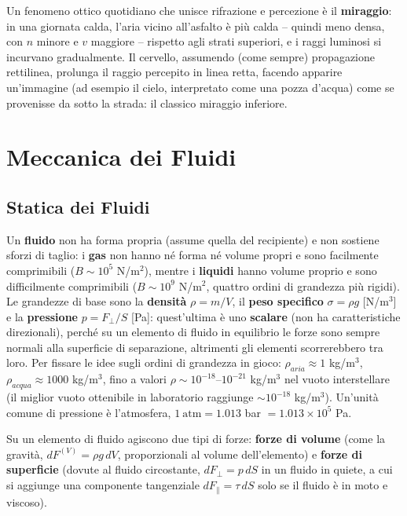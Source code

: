 \documentclass[a4paper,11pt]{article}
\begin{document}
Un fenomeno ottico quotidiano che unisce rifrazione e percezione è il \textbf{miraggio}: in una giornata calda, l'aria vicino all'asfalto è più calda -- quindi meno densa, con $n$ minore e $v$ maggiore -- rispetto agli strati superiori, e i raggi luminosi si incurvano gradualmente. Il cervello, assumendo (come sempre) propagazione rettilinea, prolunga il raggio percepito in linea retta, facendo apparire un'immagine (ad esempio il cielo, interpretato come una pozza d'acqua) come se provenisse da sotto la strada: il classico miraggio inferiore.

\newpage
\section{Meccanica dei Fluidi}

\subsection{Statica dei Fluidi}

Un \textbf{fluido} non ha forma propria (assume quella del recipiente) e non sostiene sforzi di taglio: i \textbf{gas} non hanno né forma né volume propri e sono facilmente comprimibili ($B\sim10^5$ N/m$^2$), mentre i \textbf{liquidi} hanno volume proprio e sono difficilmente comprimibili ($B\sim10^9$ N/m$^2$, quattro ordini di grandezza più rigidi). Le grandezze di base sono la \textbf{densità} $\rho=m/V$, il \textbf{peso specifico} $\sigma=\rho g$ [N/m$^3$] e la \textbf{pressione} $p=F_\perp/S$ [Pa]: quest'ultima è uno \textbf{scalare} (non ha caratteristiche direzionali), perché su un elemento di fluido in equilibrio le forze sono sempre normali alla superficie di separazione, altrimenti gli elementi scorrerebbero tra loro. Per fissare le idee sugli ordini di grandezza in gioco: $\rho_{aria}\approx1$ kg/m$^3$, $\rho_{acqua}\approx1000$ kg/m$^3$, fino a valori $\rho\sim10^{-18}$--$10^{-21}$ kg/m$^3$ nel vuoto interstellare (il miglior vuoto ottenibile in laboratorio raggiunge $\sim10^{-18}$ kg/m$^3$). Un'unità comune di pressione è l'atmosfera, $1\ \text{atm}=1.013$ bar $=1.013\times10^5$ Pa.

Su un elemento di fluido agiscono due tipi di forze: \textbf{forze di volume} (come la gravità, $dF^{(V)}=\rho g\,dV$, proporzionali al volume dell'elemento) e \textbf{forze di superficie} (dovute al fluido circostante, $dF_\perp=p\,dS$ in un fluido in quiete, a cui si aggiunge una componente tangenziale $dF_\parallel=\tau\,dS$ solo se il fluido è in moto e viscoso).
\end{document}
